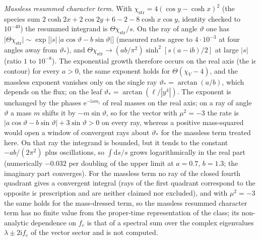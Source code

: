 \emph{Massless resummed character term.} With \(\chi_{\mathrm{str}}=4(\cos y-\cosh x)^2\) (the species sum \(2\cosh2x+2\cos2y+6-2-8\cosh x\cos y\), identity checked to \(10^{-40}\)) the resummed integrand is \(\Theta\chi_{\mathrm{str}}/s\). On the ray of angle \(\vartheta\) one has \(\bigl|\Theta\chi_{\mathrm{str}}\bigr|\sim\exp\bigl[|s|\,|a\cos\vartheta-b\sin\vartheta|\bigr]\) (measured rates agree to \(4\cdot10^{-3}\) at four angles away from \(\vartheta_*\)), and \(\Theta\chi_{\mathrm{str}}\to(ab/\pi^2)\sinh^2[s(a-\mathrm ib)/2]\) at large \(|s|\) (ratio \(1\) to \(10^{-8}\)). The exponential growth therefore occurs on the real axis (the \(\mathrm i\epsilon\) contour) for every \(a>0\), the same exponent holds for \(\Theta(\chi_V-4)\), and the massless exponent vanishes only on the single ray \(\vartheta_*=\arctan(a/b)\), which depends on the flux; on the leaf \(\vartheta_*=\arctan(\ell/|y^4|)\). The exponent is unchanged by the phases \(\mathrm e^{-\mathrm ism_i}\) of real masses on the real axis; on a ray of angle \(\vartheta\) a mass \(m\) shifts it by \(-m\sin\vartheta\), so for the vector with \(\mu^2=-3\) the rate is \(|a\cos\vartheta-b\sin\vartheta|+3\sin\vartheta>0\) on every ray, whereas a positive mass-squared would open a window of convergent rays about \(\vartheta_*\) for the massless term treated here. On that ray the integrand is bounded, but it tends to the constant \(-ab/(2\pi^2)\) plus oscillations, so \(\int\mathrm ds/s\) grows logarithmically in the real part (numerically \(-0.032\) per doubling of the upper limit at \(a=0.7\), \(b=1.3\); the imaginary part converges). For the massless term no ray of the closed fourth quadrant gives a convergent integral (rays of the first quadrant correspond to the opposite \(\mathrm i\epsilon\) prescription and are neither claimed nor excluded), and with \(\mu^2=-3\) the same holds for the mass-dressed term, so the massless resummed character term has no finite value from the proper-time representation of the class; its non-analytic dependence on \(f_e\) is that of a spectral sum over the complex eigenvalues \(\lambda\pm2\mathrm if_e\) of the vector sector and is not computed.



